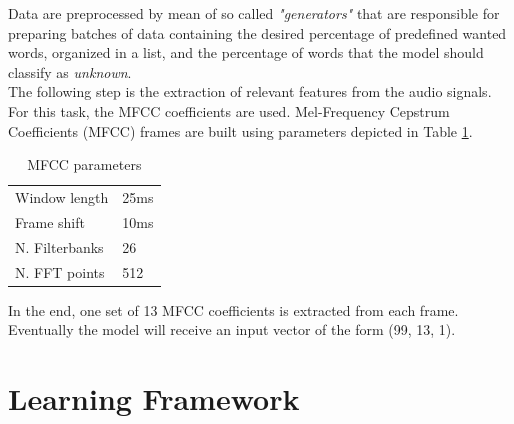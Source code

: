 \noindent Data are preprocessed by mean of so called \mbox{{\it{"generators"}}} that are responsible for preparing batches of data containing the desired percentage of predefined wanted words, organized in a list, and the percentage of words that the model should classify as {\it {unknown}}. \\The following step is the extraction of relevant features from the audio signals. For this task, the MFCC coefficients are used. Mel-Frequency Cepstrum Coefficients (MFCC) frames are built using parameters depicted in Table \ref{table:mfcc_parameters}.
\begin{table}[h!]
\centering
\begin{tabular}{ p{3cm}|p{3cm}|}
\hline
Window length & 25ms \\
Frame shift  & 10ms  \\
N. Filterbanks & 26\\
N. FFT points & 512\\
\hline
\end{tabular}
\caption{MFCC parameters}
\label{table:mfcc_parameters}
\end{table}
\noindent In the end, one set of 13 MFCC coefficients is extracted from each frame.  Eventually the model will receive an input vector of the form (99, 13, 1).



\section{Learning Framework}
\label{sec:learning_framework}

